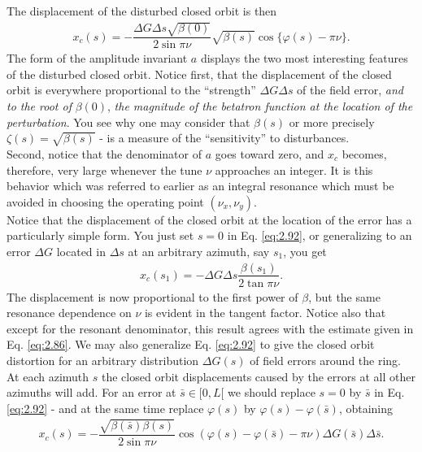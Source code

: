\documentclass[../sands-adaptation.tex]{subfiles}
\begin{document}
The displacement of the disturbed closed orbit is then
\begin{align}\label{eq:2.92}
	x_c(s) = -\dfrac{\Delta G \Delta s \sqrt{\beta(0)}}{2 \sin\pi\nu}\sqrt{\beta(s)}\cos\{\varphi(s)-\pi\nu\}.
\end{align}
The form of the amplitude invariant $a$ displays the two most interesting features of the disturbed closed orbit. Notice first, that the displacement of the closed orbit is everywhere
 proportional to the ``strength'' $\Delta G \Delta s$ of the field error, \emph{and to the root of} $\beta(0)$, \emph{the magnitude of the betatron function at the location of the perturbation}. You see why one may consider that $\beta(s)$ or more precisely $\zeta(s) = \sqrt{\beta(s)}$ - is a measure of the ``sensitivity'' to disturbances.\\
Second, notice that the denominator of $a$ goes toward zero, and $x_c$ becomes, therefore, very large whenever the tune $\nu$ approaches an integer. It is this behavior which was referred
 to earlier as an integral resonance which must be avoided in choosing the operating point $(\nu_x, \nu_y)$.\\
Notice that the displacement of the closed orbit at the location of the error has a particularly
 simple form. You just set $s = 0$ in Eq. \eqref{eq:2.92}, or generalizing to an error $\Delta G$ located in $\Delta s$ at an arbitrary azimuth, say $s_1$, you get
 \begin{align}
	x_c(s_1) = -\Delta G \Delta s \dfrac{\beta{(s_1)}}{2 \tan\pi\nu}.
\end{align}
The displacement is now proportional to the first power of $\beta$, but the same resonance
dependence on $\nu$ is evident in the tangent factor. Notice also that except for the resonant denominator, this result agrees with the estimate given in Eq. \eqref{eq:2.86}.
We may also generalize Eq. \eqref{eq:2.92} to give the closed orbit distortion for an
arbitrary distribution $\Delta G(s)$ of field errors around the ring. At each azimuth $s$ the closed orbit displacements caused by the errors at all other azimuths will add. For an error
 at $\bar{s} \in [0,L[$ we should replace $s = 0$ by $\bar{s}$ in Eq. \eqref{eq:2.92} - and at the same time replace $\varphi(s)$ by $\varphi(s) - \varphi(\bar{s})$, obtaining
\begin{align}\label{eq:dist_closed_orb}
x_c(s) = -\dfrac{\sqrt{\beta(\bar{s})\beta(s)}}{2\sin\pi\nu} \cos(\varphi(s)-\varphi(\bar{s})-\pi\nu)\Delta G(\bar{s})\Delta\bar{s}.
\end{align}
\end{document}
